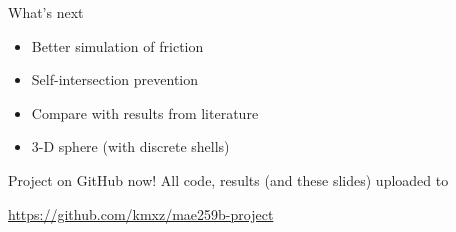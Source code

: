 \documentclass{beamer}
\begin{document}
	\begin{frame}{What's next}
		\begin{itemize}
			\item Better simulation of friction
			\item Self-intersection prevention
			\item Compare with results from literature
			\item 3-D sphere (with discrete shells)
		\end{itemize}
	\end{frame}
	\begin{frame}{Project on GitHub now!}
		All code, results (and these slides) uploaded to
		
		\begin{center}
			\url{https://github.com/kmxz/mae259b-project}
			
		\end{center}
	\end{frame}
\end{document}
